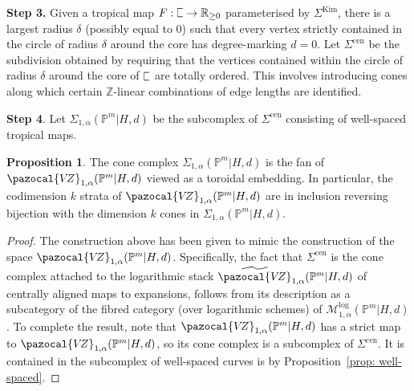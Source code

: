 \documentclass[11pt]{amsart}
\newcommand{\plC}{\scalebox{0.8}[1.3]{$\sqsubset$}}
\newcommand{\Z}{\mathbb{Z}}
\newcommand{\VZ}{\pazocal{V\!Z}}
\renewcommand{\to}{\rightarrow}
\theoremstyle{definition}
\newtheorem{prop}[thm]{Proposition}
\theoremstyle{definition}
\begin{document}
\noindent
\textbf{Step 3.} Given a tropical map $F: \plC\to \mathbb R_{\geq 0}$ parameterised by $\Sigma^{\mathrm{Kim}}$, there is a largest radius $\delta$ (possibly equal to $0$) such that every vertex strictly contained in the circle of radius $\delta$ around the core has degree-marking $d=0$. Let $
\Sigma^{\mathrm{cen}}$ be the subdivision obtained by requiring that the vertices contained within the circle of radius $\delta$ around the core of $\plC$ are totally ordered. This involves introducing cones along which certain $\Z$-linear combinations of edge lengths are identified.\smallskip

\noindent
\textbf{Step 4}. Let $\Sigma_{1,\alpha}(\mathbb P^m|H,d)$ be the subcomplex of $\Sigma^{\mathrm{cen}}$ consisting of well-spaced tropical maps.

\begin{prop}
The cone complex $
\Sigma_{1,\alpha}(\mathbb P^m|H,d)$ is the fan of $
\VZ_{1,\alpha}(\mathbb P^m|H,d)$ viewed as a toroidal embedding. In particular, the codimension $k$ strata of $
\VZ_{1,\alpha}(\mathbb P^m|H,d)$ are in inclusion reversing bijection with the dimension $k$ cones in $
\Sigma_{1,\alpha}(\mathbb P^m|H,d)$.
\end{prop}

\begin{proof}
The construction above has been given to mimic the construction of the space $
\VZ_{1,\alpha}(\mathbb P^m|H,d)$. Specifically, the fact that $\Sigma^{\mathrm{cen}}$ is the cone complex attached to the logarithmic stack $\widetilde{\VZ}_{1,\alpha}(\mathbb P^m|H,d)$ of centrally aligned maps to expansions, follows from its description as a subcategory of the fibred category (over logarithmic schemes) of $\mathcal M^{\mathrm{log}}_{1,\alpha}(\mathbb P^m|H,d)$. To complete the result, note that $
\VZ_{1,\alpha}(\mathbb P^m|H,d)$ has a strict map to $
\VZ_{1,\alpha}(\mathbb P^m|H,d)$, so its cone complex is a subcomplex of $\Sigma^{\mathrm{cen}}$. It is contained in the subcomplex of well-spaced curves is by Proposition~\ref{prop: well-spaced}.
\end{proof}
\end{document}

